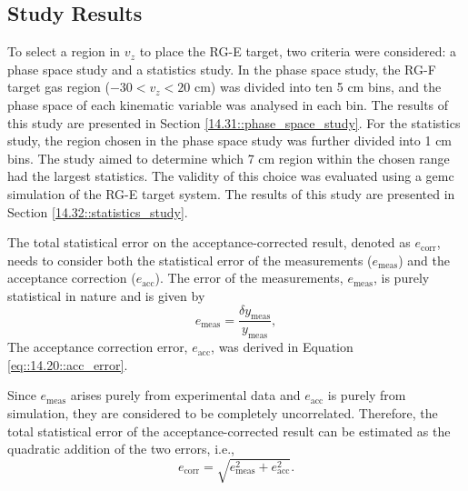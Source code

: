 \subsection{Study Results}
\label{14.30::study_results}
    To select a region in $v_z$ to place the RG-E target, two criteria were considered: a phase space study and a statistics study.
    In the phase space study, the RG-F target gas region ($-30 < v_z < 20$ cm) was divided into ten 5 cm bins, and the phase space of each kinematic variable was analysed in each bin.
    The results of this study are presented in Section \ref{14.31::phase_space_study}.
    For the statistics study, the region chosen in the phase space study was further divided into 1 cm bins.
    The study aimed to determine which 7 cm region within the chosen range had the largest statistics.
    The validity of this choice was evaluated using a gemc simulation of the RG-E target system.
    The results of this study are presented in Section \ref{14.32::statistics_study}.

    The total statistical error on the acceptance-corrected result, denoted as $e_\text{corr}$, needs to consider both the statistical error of the measurements ($e_\text{meas}$) and the acceptance correction ($e_\text{acc}$).
    The error of the measurements, $e_\text{meas}$, is purely statistical in nature and is given by
    \begin{equation*}
        e_\text{meas} = \frac{\delta y_\text{meas}}{y_\text{meas}},
    \end{equation*}
    The acceptance correction error, $e_\text{acc}$, was derived in Equation \eqref{eq::14.20::acc_error}.

    Since $e_\text{meas}$ arises purely from experimental data and $e_\text{acc}$ is purely from simulation, they are considered to be completely uncorrelated.
    Therefore, the total statistical error of the acceptance-corrected result can be estimated as the quadratic addition of the two errors, i.e.,
    \begin{equation*}
        e_\text{corr} = \sqrt{e_\text{meas}^2 + e_\text{acc}^2}.
    \end{equation*}

    
    
